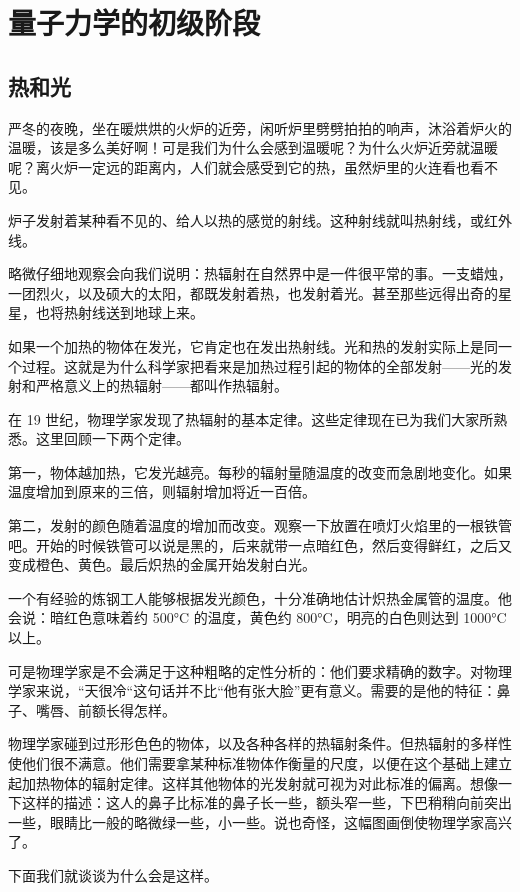 \chapter{量子力学的初级阶段}

\section{热和光}

严冬的夜晚，坐在暖烘烘的火炉的近旁，闲听炉里劈劈拍拍的响声，沐浴着炉火的温暖，该是多么美好啊！可是我们为什么会感到温暖呢？为什么火炉近旁就温暖呢？离火炉一定远的距离内，人们就会感受到它的热，虽然炉里的火连看也看不见。

炉子发射着某种看不见的、给人以热的感觉的射线。这种射线就叫热射线，或红外线。

略微仔细地观察会向我们说明：热辐射在自然界中是一件很平常的事。一支蜡烛，一团烈火，以及硕大的太阳，都既发射着热，也发射着光。甚至那些远得出奇的星星，也将热射线送到地球上来。

如果一个加热的物体在发光，它肯定也在发出热射线。光和热的发射实际上是同一个过程。这就是为什么科学家把看来是加热过程引起的物体的全部发射——光的发射和严格意义上的热辐射——都叫作热辐射。

在 19 世纪，物理学家发现了热辐射的基本定律。这些定律现在已为我们大家所熟悉。这里回顾一下两个定律。

第一，物体越加热，它发光越亮。每秒的辐射量随温度的改变而急剧地变化。如果温度增加到原来的三倍，则辐射增加将近一百倍。

第二，发射的颜色随着温度的增加而改变。观察一下放置在喷灯火焰里的一根铁管吧。开始的时候铁管可以说是黑的，后来就带一点暗红色，然后变得鲜红，之后又变成橙色、黄色。最后炽热的金属开始发射白光。

一个有经验的炼钢工人能够根据发光颜色，十分准确地估计炽热金属管的温度。他会说：暗红色意味着约 500°C 的温度，黄色约 800°C，明亮的白色则达到 1000°C 以上。

可是物理学家是不会满足于这种粗略的定性分析的：他们要求精确的数字。对物理学家来说，“天很冷“这句话并不比“他有张大脸”更有意义。需要的是他的特征：鼻子、嘴唇、前额长得怎样。

物理学家碰到过形形色色的物体，以及各种各样的热辐射条件。但热辐射的多样性使他们很不满意。他们需要拿某种标准物体作衡量的尺度，以便在这个基础上建立起加热物体的辐射定律。这样其他物体的光发射就可视为对此标准的偏离。想像一下这样的描述：这人的鼻子比标准的鼻子长一些，额头窄一些，下巴稍稍向前突出一些，眼睛比一般的略微绿一些，小一些。说也奇怪，这幅图画倒使物理学家高兴了。

下面我们就谈谈为什么会是这样。

